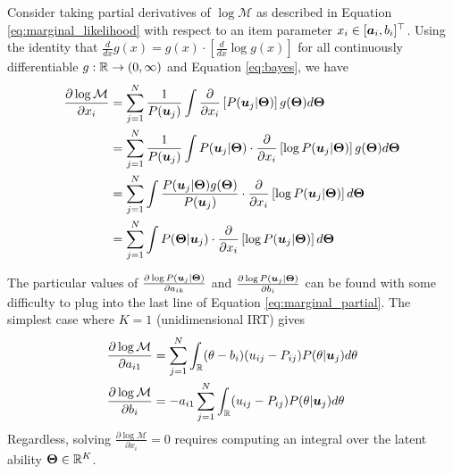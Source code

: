 Consider taking partial derivatives of $\log \mathcal{M}$ as described in Equation \ref{eq:marginal_likelihood} with respect to an item parameter $x_i \in [\boldsymbol{a}_i, b_i]^\top$. Using the identity that $\frac{d}{dx}g(x) = g(x) \cdot \left[\frac{d}{dx}\log g(x)\right]$ for all continuously differentiable $g:\mathbb{R} \to (0,\infty)$ and Equation \ref{eq:bayes}, we have 
\begin{equation}
\begin{split}
  \frac{\partial \log \mathcal{M}}{\partial x_i} &= \sum_{j=1}^N \frac{1}{P(\boldsymbol{u}_j)} \int \frac{\partial}{\partial x_i} \left[ P(\boldsymbol{u}_j | \boldsymbol{\Theta}) \right] g(\boldsymbol{\Theta}) d \boldsymbol{\Theta} \\
  &= \sum_{j=1}^N \frac{1}{P(\boldsymbol{u}_j)} \int P(\boldsymbol{u}_j | \boldsymbol{\Theta}) \cdot \frac{\partial}{\partial x_i}\left[\log P(\boldsymbol{u}_j | \boldsymbol{\Theta}) \right] g(\boldsymbol{\Theta}) d \boldsymbol{\Theta} \\
  &= \sum_{j=1}^N \int \frac{P(\boldsymbol{u}_j | \boldsymbol{\Theta})g(\boldsymbol{\Theta})}{P(\boldsymbol{u}_j)}  \cdot \frac{\partial}{\partial x_i}\left[\log P(\boldsymbol{u}_j | \boldsymbol{\Theta}) \right] d\boldsymbol{\Theta} \\
  &= \sum_{j=1}^N \int P(\boldsymbol{\Theta} | \boldsymbol{u}_j) \cdot \frac{\partial}{\partial x_i} \left[\log P(\boldsymbol{u}_j | \boldsymbol{\Theta}) \right] d \boldsymbol{\Theta}
\end{split}
  \label{eq:marginal_partial}
\end{equation}

The particular values of $\frac{\partial \log P(\boldsymbol{u}_j | \boldsymbol{\Theta})}{\partial a_{ik}}$ and $\frac{\partial \log P(\boldsymbol{u}_j | \boldsymbol{\Theta})}{\partial b_i}$ can be found with some difficulty \cite{baker_kim2004} to plug into the last line of Equation \ref{eq:marginal_partial}. The simplest case where $K=1$ (unidimensional IRT) gives
\begin{equation}
\begin{split}
  \frac{\partial \log \mathcal{M}}{\partial a_{i1}} &= \sum_{j=1}^N \int_\mathbb{R} (\theta - b_i)(u_{ij} - P_{ij}) P(\theta | \boldsymbol{u}_j) d \theta \\
  \frac{\partial \log \mathcal{M}}{\partial b_i} &= -a_{i1} \sum_{j=1}^N \int_\mathbb{R} (u_{ij} - P_{ij}) P(\theta | \boldsymbol{u}_j) d\theta
\end{split}
  \label{eq:unidim_marginal_partial}
\end{equation}
Regardless, solving $\frac{\partial \log \mathcal{M}}{\partial x_i} = 0$ requires computing an integral over the latent ability $\boldsymbol{\Theta} \in \mathbb{R}^K$.

